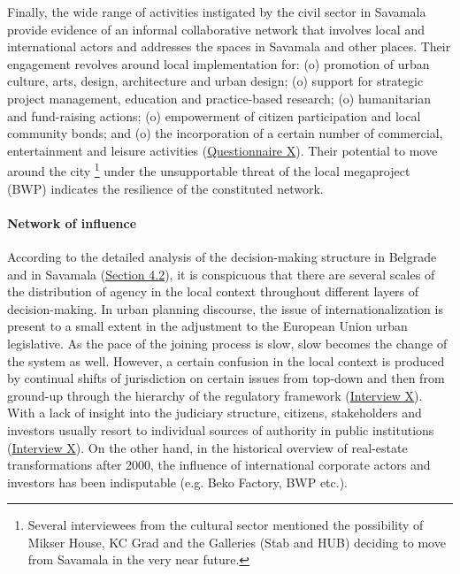 \documentclass[11pt]{report}
\begin{document}
{{{{Finally, the wide range of activities instigated by the civil sector in Savamala provide evidence of an informal collaborative network that involves local and international actors and addresses the spaces in Savamala and other places. Their engagement revolves around local implementation for:  (o) promotion of urban culture, arts, design, architecture and urban design; (o) support for strategic project management, education and practice-based research; (o) humanitarian and fund-raising actions; (o) empowerment of citizen participation and local community bonds; and (o) the incorporation of a certain number of commercial, entertainment and leisure activities 
(\href{Questionnaire Students Savamala}{Questionnaire X}).
Their potential to move around the city
\footnote{Several interviewees from the cultural sector mentioned the possibility of Mikser House, KC Grad and the Galleries (Stab and HUB) deciding to move from Savamala in the very near future.}
under the unsupportable threat of the local megaproject (BWP) indicates the resilience of the constituted network.  

\paragraph{Network of influence}

According to the detailed analysis of the decision-making structure in Belgrade and in Savamala (\href{Section 4.2}{Section 4.2}), it is conspicuous that there are several scales of the distribution of agency in the local context throughout different layers of decision-making.
In urban planning discourse, the issue of internationalization is present to a small extent in the adjustment to the European Union urban legislative. As the pace of the joining process is slow, slow becomes the change of the system as well. 
However, a certain confusion in the local context is produced by continual shifts of jurisdiction on certain issues from top-down and then from ground-up through the hierarchy of the regulatory framework (\href{InterviewX}{Interview X}).
With a lack of insight into the judiciary structure, citizens, stakeholders and investors usually resort to individual sources of authority in public institutions (\href{InterviewX}{Interview X}).
On the other hand, in the historical overview of real-estate transformations after 2000, the influence of international corporate actors and investors has been indisputable (e.g. Beko Factory, BWP etc.).

}}}}
\end{document}
